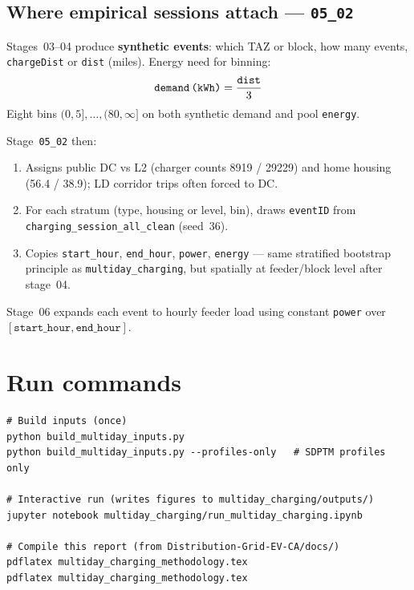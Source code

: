 \documentclass[11pt,a4paper]{article}
\begin{document}
\subsection{Where empirical sessions attach --- \texttt{05\_02}}
Stages~03--04 produce \textbf{synthetic events}: which TAZ or block, how many events, \texttt{chargeDist} or \texttt{dist} (miles). Energy need for binning:
\begin{equation}
  \texttt{demand\,(kWh)} = \frac{\texttt{dist}}{3}
\end{equation}
\noindent Eight bins $(0,5],\ldots,(80,\infty]$ on both synthetic demand and pool \texttt{energy}.

Stage~\texttt{05\_02} then:
\begin{enumerate}[noitemsep]
  \item Assigns public DC vs L2 (charger counts 8919 / 29229) and home housing (56.4 / 38.9); LD corridor trips often forced to DC.
  \item For each stratum (type, housing or level, bin), draws \texttt{eventID} from \texttt{charging\_session\_all\_clean} (seed~36).
  \item Copies \texttt{start\_hour}, \texttt{end\_hour}, \texttt{power}, \texttt{energy} --- same stratified bootstrap principle as \texttt{multiday\_charging}, but spatially at feeder/block level after stage~04.
\end{enumerate}
Stage~06 expands each event to hourly feeder load using constant \texttt{power} over $[\texttt{start\_hour},\texttt{end\_hour}]$.

\section{Run commands}

\begin{lstlisting}
# Build inputs (once)
python build_multiday_inputs.py
python build_multiday_inputs.py --profiles-only   # SDPTM profiles only

# Interactive run (writes figures to multiday_charging/outputs/)
jupyter notebook multiday_charging/run_multiday_charging.ipynb

# Compile this report (from Distribution-Grid-EV-CA/docs/)
pdflatex multiday_charging_methodology.tex
pdflatex multiday_charging_methodology.tex
\end{lstlisting}
\end{document}
